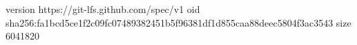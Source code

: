 version https://git-lfs.github.com/spec/v1
oid sha256:fa1bcd5ce1f2c09fc07489382451b5f96381df1d855caa88deec5804f3ac3543
size 6041820
